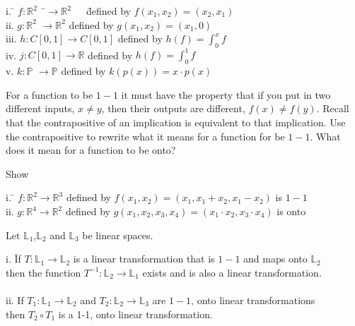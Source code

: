 \begin{myexb}[\bd{b}]
	\begin{tabbing}
		\indent i. \quad \= $f:\mathbb{R}^2$ \ \=$\rightarrow \mathbb{R}^2 $\ \ \   \=defined by $f(x_1,x_2)= (x_2 ,x_1)$  \\
		\indent ii. \> $g:\mathbb{R}^2$ \>$\rightarrow \mathbb{R}^2 $ \>defined by  $g(x_1, x_2) = (x_1,0) $ \\ 
			\indent iii. \> $h:C[0,1] \rightarrow C[0,1] $ defined by  $h(f) = \int^x_0f $  \\
			\indent iv. \>  $j:C[0,1] \rightarrow \mathbb{R} $ defined by  $h(f) = \int^1_0f $  \\
			\indent v. \>  $k:\mathbb{P} $ \>$\rightarrow \mathbb{P}$ \>defined by  $k(p(x)) = x\cdot p(x)$ 
	\end{tabbing}
\end{myexb}

 \noindent {} For a function to be $1-1$  it must have the property that if you put in two different inputs, $x \neq y$, then their outputs are different, $f(x) \neq f(y)$. Recall that the contrapositive of an implication is equivalent to that implication.  Use the contrapositive to rewrite what it means for a function for be $1-1$.  What does it mean for a function to be onto? 
 
 \vspace{.5cm}
\begin{myexc}[\bd{c}]
Show 
\begin{tabbing}
	\indent i. \quad \= $f:\mathbb{R}^2 \longrightarrow \mathbb{R}^3 $ defined by $f(x_1,x_2)= (x_1,x_1+x_2,x_1-x_2)$  is $1-1$ \\
	\indent ii. \> $g:\mathbb{R}^4 \longrightarrow \mathbb{R}^2 $ defined by  $g(x_1,x_2,x_3,x_4) = (x_1 \cdot x_2, x_3\cdot x_4)$  is onto
\end{tabbing}
\end{myexc}

\vspace{.5cm}

\begin{theorem} Let $\mathbb{L}_1 $,$\mathbb{L}_2$ and $\mathbb{L}_3$ be linear spaces.
			\begin{tabbing} 
			\indent i. \quad  \= If $T:\mathbb{L}_1 \longrightarrow \mathbb{L}_2 $ is a linear transformation that is $1-1$ and maps onto  $\mathbb{L}_2$ \\ \> then the function $T^{-1}:\mathbb{L}_2 \longrightarrow \mathbb{L}_1$ exists and is also a linear transformation. \\ \\
			\indent ii.\> If  $T_1:\mathbb{L}_1 \longrightarrow \mathbb{L}_2 $ and  $T_2:\mathbb{L}_2 \longrightarrow \mathbb{L}_3 $ are $1-1$, onto linear transformations\\ \> then $T_2 \circ T_1$ is a 1-1, onto linear transformation.
			  \\
		\end{tabbing}
\end{theorem}

